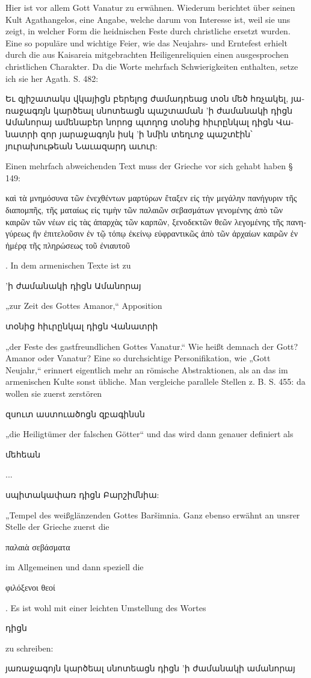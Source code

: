 \documentclass{article}
\begin{document}
Hier ist vor allem Gott Vanatur zu erwähnen. Wiederum berichtet über seinen Kult Agathangelos, eine Angabe, welche darum von Interesse ist, weil sie uns zeigt, in welcher Form die heidnischen Feste durch christliche ersetzt wurden. Eine so populäre und wichtige Feier, wie das Neujahrs- und Erntefest erhielt durch die aus Kaisareia mitgebrachten Heiligenreliquien einen ausgesprochen christlichen Charakter. Da die Worte mehrfach Schwierigkeiten enthalten, setze ich sie her Agath. S. 482: \begin{armenian}Եւ զյիշատակս վկայիցն բերելոց ժամադրեաց տօն մեծ հռչակել, յառաջագռյն կարծեալ սնոտեացն պաշտաման 'ի ժամանակի դիցն Ամանորայ ամենաբեր նորոց պտղոց տօնից հիւրընկալ դիցն Վանատրի զոր յարաջագոյն իսկ 'ի նմին տեղւոջ պաշտէին՝ յուրախութեան Նաւազարդ աւուր:\end{armenian} Einen mehrfach abweichenden Text muss der Grieche vor sich gehabt haben § 149: \begin{greek}καὶ τὰ μνημόσυνα τῶν ἐνεχθέντων μαρτύρων ἔταξεν εἰς τὴν μεγάλην πανήγυριν τῆς διαπομπῆς, τῆς ματαίως εἰς τιμὴν τῶν παλαιῶν σεβασμάτων γενομένης ἀπὸ τῶν καιρῶν τῶν νέων εἰς τὰς ἀπαρχὰς τῶν καρπῶν, ξενοδεκτῶν θεῶν λεγομένης τῆς πανηγύρεως ἣν ἐπιτελοῦσιν ἐν τῷ τόπῳ ἐκείνῳ εὐφραντικῶς ἀπὸ τῶν ἀρχαίων καιρῶν ἐν ἡμέρᾳ τῆς πληρώσεως τοῦ ἐνιαυτοῦ\end{greek}. In dem armenischen Texte ist zu \begin{armenian}'ի ժամանակի դիցն Ամանորայ\end{armenian} „zur Zeit des Gottes Amanor,“ Apposition \begin{armenian}տօնից հիւրընկալ դիցն Վանատրի\end{armenian} „der Feste des gastfreundlichen Gottes Vanatur.“ Wie heißt demnach der Gott? Amanor oder Vanatur? Eine so durchsichtige Personifikation, wie „Gott Neujahr,“ erinnert eigentlich mehr an römische Abstraktionen, als an das im armenischen Kulte sonst übliche. Man vergleiche parallele Stellen z. B. S. 455: da wollen sie zuerst zerstören \begin{armenian}զսուտ աստուածոցն զբագինսն\end{armenian} „die Heiligtümer der falschen Götter“ und das wird dann genauer definiert als \begin{armenian}մեհեան\end{armenian}... \begin{armenian}սպիտակափառ դիցն Բարշիմնիա:\end{armenian} „Tempel des weißglänzenden Gottes Baršimnia. Ganz ebenso erwähnt an unsrer Stelle der Grieche zuerst die \begin{greek}παλαιὰ σεβάσματα\end{greek} im Allgemeinen und dann speziell die \begin{greek}φιλόξενοι θεοί\end{greek}. Es ist wohl mit einer leichten Umstellung des Wortes \begin{armenian}դիցն\end{armenian} zu schreiben: \begin{armenian}յառաջագոյն կարծեալ սնոտեացն դիցն 'ի ժամանակի ամանորայ\end{armenian} 
\end{document}
